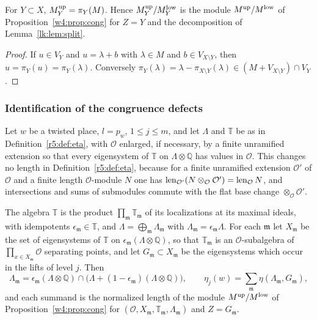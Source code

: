 \begin{lemma}\label{lk:lem:proj}
For $Y\subset X$, $M^{\rm up}_Y=\pi_Y(M)$. Hence $M^{\rm up}_Y/M^{\rm low}_Y$ is the module $M^{\rm up}/M^{\rm low}$ of Proposition~\ref{w4:prop:cong} for $Z=Y$ and the decomposition of Lemma~\ref{lk:lem:split}.
\end{lemma}

\begin{proof}
If $u\in V_Y$ and $u=\lambda+b$ with $\lambda\in M$ and $b\in V_{X\setminus Y}$, then $u=\pi_Y(u)=\pi_Y(\lambda)$. Conversely $\pi_Y(\lambda)=\lambda-\pi_{X\setminus Y}(\lambda)\in(M+V_{X\setminus Y})\cap V_Y$.
\end{proof}

\subsubsection*{Identification of the congruence defects}

Let $w$ be a twisted place, $l=p_w$, $1\le j\le m$, and let $\Lambda$ and $\mathbb T$ be as in Definition~\ref{r5:def:eta}, with $\mathcal O$ enlarged, if necessary, by a finite unramified extension so that every eigensystem of $\mathbb T$ on $\Lambda\otimes\mathbb Q$ has values in $\mathcal O$. This changes no length in Definition~\ref{r5:def:eta}, because for a finite unramified extension $\mathcal O'$ of $\mathcal O$ and a finite length $\mathcal O$-module $N$ one has $\operatorname{len}_{\mathcal O'}(N\otimes_{\mathcal O}\mathcal O')=\operatorname{len}_{\mathcal O}N$, and intersections and sums of submodules commute with the flat base change $\otimes_{\mathcal O}\mathcal O'$.

\begin{proposition}\label{lk:prop:ident}
The algebra $\mathbb T$ is the product $\prod_{\mathfrak m}\mathbb T_{\mathfrak m}$ of its localizations at its maximal ideals, with idempotents $\epsilon_{\mathfrak m}\in\mathbb T$, and $\Lambda=\bigoplus_{\mathfrak m}\Lambda_{\mathfrak m}$ with $\Lambda_{\mathfrak m}=\epsilon_{\mathfrak m}\Lambda$. For each $\mathfrak m$ let $X_{\mathfrak m}$ be the set of eigensystems of $\mathbb T$ on $\epsilon_{\mathfrak m}(\Lambda\otimes\mathbb Q)$, so that $\mathbb T_{\mathfrak m}$ is an $\mathcal O$-subalgebra of $\prod_{x\in X_{\mathfrak m}}\mathcal O$ separating points, and let $G_{\mathfrak m}\subset X_{\mathfrak m}$ be the eigensystems which occur in the lifts of level $j$. Then
\[
\Lambda_{\mathfrak m}=\epsilon_{\mathfrak m}(\Lambda\otimes\mathbb Q)\cap\big(\Lambda+(1-\epsilon_{\mathfrak m})(\Lambda\otimes\mathbb Q)\big),\qquad
\eta_j(w)=\sum_{\mathfrak m}\eta(\Lambda_{\mathfrak m},G_{\mathfrak m}),
\]
and each summand is the normalized length of the module $M^{\rm up}/M^{\rm low}$ of Proposition~\ref{w4:prop:cong} for $(\mathcal O,X_{\mathfrak m},\mathbb T_{\mathfrak m},\Lambda_{\mathfrak m})$ and $Z=G_{\mathfrak m}$.
\end{proposition}

